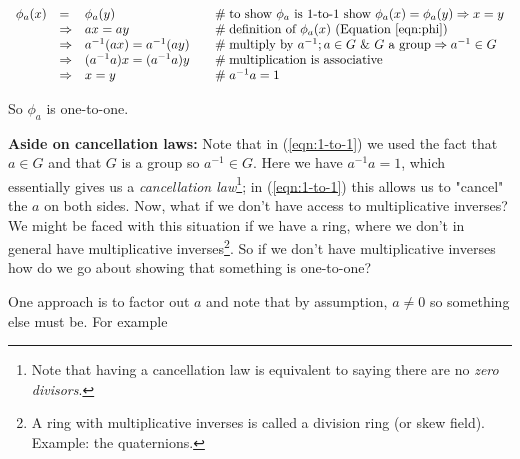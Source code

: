 \documentclass{article}
\theoremstyle{definition}
\begin{document}
\begin{equation}
\begin{array}{llll}
\phi_{a}(x)  
&=&                 \phi_{a}(y)                        &\quad  \mathrel{\#} \text{to show $\phi_a$ is 1-to-1 show } \phi_a(x) = \phi_a(y) \Rightarrow x = y      \\                                                                                                                     
&\Rightarrow& ax = ay                            &\quad  \mathrel{\#} \text{definition of $\phi_a(x)$ (Equation \ref{eqn:phi})}                                                                                     \\
&\Rightarrow& a^{-1}(ax) = a^{-1}(ay)     &\quad  \mathrel{\#} \text{multiply by $a^{-1}$};  a \in G \text{ \& $G$ a group} \Rightarrow a^{-1} \in G \\
&\Rightarrow&  (a^{-1}a)x = (a^{-1}a)y    &\quad  \mathrel{\#} \text{multiplication is associative}                                                                             \\
&\Rightarrow&  x = y                                &\quad  \mathrel{\#} a^{-1}a = 1 
\end{array}
\label{eqn:1-to-1}
\end{equation}

\bigskip
\noindent
So $\phi_{a}$ is one-to-one.

\bigskip
\noindent
\textbf{Aside on cancellation laws:} Note that in (\ref{eqn:1-to-1}) we used the fact that $a \in G$ and that $G$ is a group so $a^{-1} \in G$.
Here we have  $a^{-1}a = 1$, which essentially gives us a \emph{cancellation law}\footnote{Note that having a cancellation law is equivalent to saying 
there are no \emph{zero divisors}.}; in  (\ref{eqn:1-to-1}) this allows us to "cancel" the $a$ on both sides. Now, what if we don't have 
access to multiplicative inverses? We might be faced with this situation if we have a ring, where we don't in general have multiplicative 
inverses\footnote{A ring with multiplicative inverses is called a division ring (or skew field).  Example: the quaternions.}. So if we don't  have multiplicative 
inverses how do we go about showing that something is one-to-one? 

\bigskip
\noindent
One  approach is to factor out $a$ and note that by assumption, $a \neq 0$
so something else must be. For example
\end{document}
